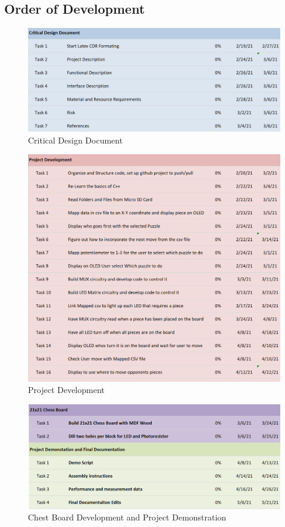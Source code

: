 \documentclass[11pt]{article}
\begin{document}
\subsection{Order of Development}
\begin{figure}
  \includegraphics[width=\linewidth]{./Pics/Critical_design_document_gnatt.PNG}
  \caption{Critical Design Document}
  \label{fig:CDD}
\end{figure}


\begin{figure}
  \includegraphics[width=\linewidth]{./Pics/Project_Development.PNG}
  \caption{Project Development}
  \label{fig:PD}
\end{figure}


\begin{figure}
  \includegraphics[width=\linewidth]{./Pics/Chess_Board_Project Demostation_Gnatt.PNG}
  \caption{Chest Board Development and Project Demonstration}
  \label{fig:CBPD}
\end{figure}
\end{document}
